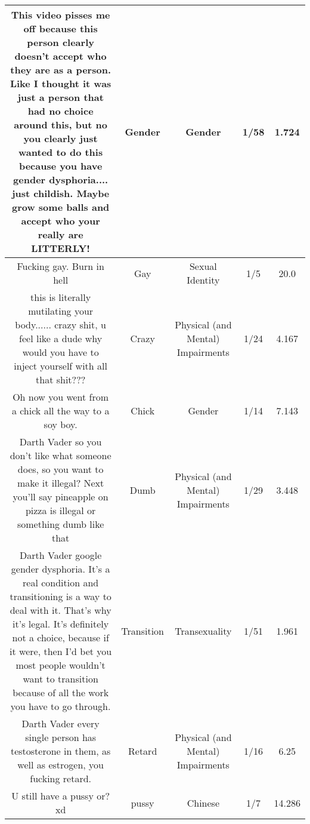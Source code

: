 \documentclass[11pt]{article}
\newlength\mylength
\begin{document}
\begin{center}
\begin{longtable}{|C{.40\mylength}|C{.30\mylength}|C{.15\mylength}|C{.15\mylength}|C{.15\mylength}|}
  This video pisses me off because this person clearly doesn't accept who they are as a person. Like I thought it was just a person that had no choice around this, but no you clearly just wanted to do this because you have gender dysphoria.... just childish. Maybe grow some balls and accept who your really are LITTERLY!  & Gender & Gender & 1/58 & 1.724 \\  \hline
  Fucking gay. Burn in hell  & Gay & Sexual Identity & 1/5 & 20.0 \\  \hline
  this is literally mutilating your body...... crazy shit, u feel like a dude why would you have to inject yourself with all that shit???  & Crazy & Physical (and Mental) Impairments & 1/24 & 4.167 \\  \hline
  Oh now you went from a chick all the way to a soy boy.  & Chick & Gender & 1/14 & 7.143 \\  \hline
  Darth Vader so you don't like what someone does, so you want to make it illegal? Next you'll say pineapple on pizza is illegal or something dumb like that  & Dumb & Physical (and Mental) Impairments & 1/29 & 3.448 \\  \hline
  Darth Vader google gender dysphoria. It's a real condition and transitioning is a way to deal with it. That's why it's legal. It's definitely not a choice, because if it were, then I'd bet you most people wouldn't want to transition because of all the work you have to go through.  & Transition & Transexuality & 1/51 & 1.961 \\  \hline
  Darth Vader every single person has testosterone in them, as well as estrogen, you fucking retard.  & Retard & Physical (and Mental) Impairments & 1/16 & 6.25 \\  \hline
  U still have a pussy or? xd  & pussy & Chinese & 1/7 & 14.286 \\  \hline

\end{longtable}
\end{center}
\end{document}
